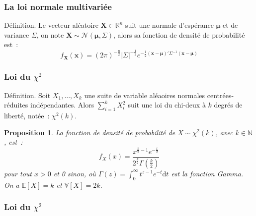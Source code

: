 \documentclass[10pt]{beamer}
\theoremstyle{plain}
\newenvironment{defn}[1]
{\bgroup \small\begin{block}{Définition. #1}}
  {\end{block}\egroup}
\newtheorem{prop}{Proposition}
\begin{document}
\begin{frame}
  \frametitle{La loi normale multivariée}

  \begin{defn}{}
    Le vecteur aléatoire $\bm{X}\in \mathbb R^n$ suit une normale d'espérance $\bm \mu$ et de variance $\Sigma$, on note $\bm{X}\sim\mathcal N \left(\bm\mu, \Sigma\right)$, alors sa fonction de densité de probabilité est~:
    \[
      f_{\bm X}(\bm x) = \left( 2\pi \right)^{-\frac{n}{2}}\left| \Sigma \right|^{-\frac{1}{2}}e^{-\frac{1}{2}\left(\bm x-\bm\mu\right)'\Sigma^{-1}\left(\bm x-\bm\mu\right)}
    \]
  \end{defn}

\end{frame}


\begin{frame}
  \frametitle{Loi du $\chi^2$}

  \begin{defn}{}
    Soit $X_1, \dots, X_k$ une suite de variable aléaoires normales centrées-réduites indépendantes. Alors $\sum_{i=1}^kX_i^2$ suit une loi du chi-deux à $k$ degrés de liberté, notée~: $\chi^2(k)$.
  \end{defn}

  \bigskip

  \begin{prop}\label{prop:chi2}
    La fonction de densité de probabilité de $X\sim\chi^2(k)$,
    avec $k\in\mathbb N$, est~:
    \[
      f_X(x) = \frac{x^{\frac{k}{2}-1}e^{-\frac{x}{2}}}{2^{\frac{k}{2}}\Gamma\left(\frac{k}{2}\right)}
    \]
    pour tout $x>0$ et 0 sinon, où $\Gamma(z) = \int_0^{\infty}t^{z-1}e^{-t}\mathrm dt$ est la
    fonction Gamma. On a $\mathbb E\left[ X \right]=k$ et $\mathbb V\left[ X \right] = 2k$.
  \end{prop}

\end{frame}


\begin{frame}
  \frametitle{Loi du $\chi^2$}

  \bigskip

  \begin{center}
    
  \end{center}


\end{frame}
\end{document}
